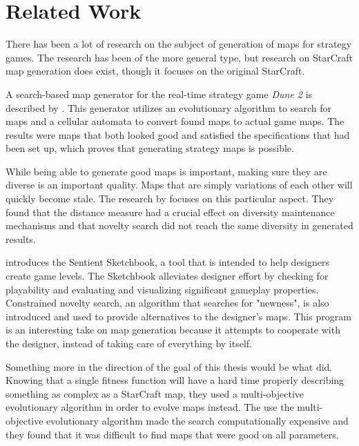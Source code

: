 \chapter{Related Work}
\label{relatedwork}

There has been a lot of research on the subject of generation of maps for strategy games. The research has been of the more general type, but research on StarCraft map generation does exist, though it focuses on the original StarCraft.

A search-based map generator for the real-time strategy game \textit{Dune 2} is described by \citeauthor{Mahlmann2012Spicing}\cite{Mahlmann2012Spicing}. This generator utilizes an evolutionary algorithm to search for maps and a cellular automata to convert found maps to actual game maps. The results were maps that both looked good and satisfied the specifications that had been set up, which proves that generating strategy maps is possible.

While being able to generate good maps is important, making sure they are diverse is an important quality. Maps that are simply variations of each other will quickly become stale. The research by \citeauthor{Preuss2014Searching}\cite{Preuss2014Searching} focuses on this particular aspect. They found that the distance measure had a crucial effect on diversity maintenance mechanisms and that novelty search did not reach the same diversity in generated results.

\citeauthor{Liapis2013sentient}\cite{Liapis2013sentient} introduces the Sentient Sketchbook, a tool that is intended to help designers create game levels. The Sketchbook alleviates designer effort by checking for playability and evaluating and visualizing significant gameplay properties. Constrained novelty search, an algorithm that searches for "newness",  is also introduced and used to provide alternatives to the designer's maps. This program is an interesting take on map generation because it attempts to cooperate with the designer, instead of taking care of everything by itself.

Something more in the direction of the goal of this thesis would be what \citeauthor{Togelius2010Multiobjective}\cite{Togelius2010Multiobjective} did. Knowing that a single fitness function will have a hard time properly describing something as complex as a StarCraft map, they used a multi-objective evolutionary algorithm in order to evolve maps instead. The use the multi-objective evolutionary algorithm made the search computationally expensive and they found that it was difficult to find maps that were good on all parameters.

